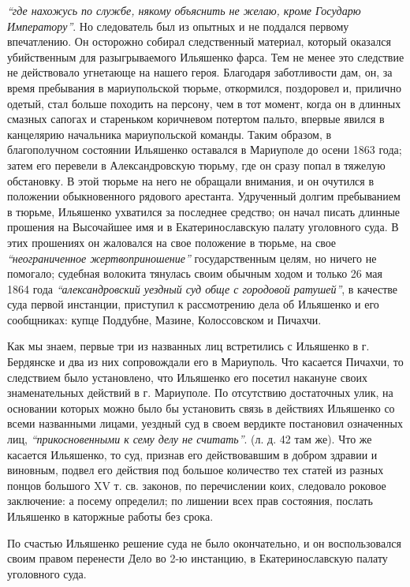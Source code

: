 \documentclass[a4paper,20pt]{article}
\begin{document}
\emph{``где нахожусь по службе, някому объяснить не желаю, кроме Государю Императору''}. 
Но следователь был из опытных и не поддался первому впечатлению. Он осторожно собирал следственный материал, который оказался
убийственным для разыгрываемого Ильяшенко фарса.
Тем не менее это следствие не действовало угнетающе на нашего героя. 
Благодаря заботливости дам, он, за время пребывания в мариупольской тюрьме, откормился, 
поздоровел и, прилично одетый, стал больше походить на персону, чем в тот
момент, когда он в длинных смазных сапогах и стареньком коричневом потертом пальто, 
впервые явился в
канцелярию начальника мариупольской команды. Таким образом, в благополучном состоянии Ильяшенко оставался в Мариуполе до осени
1863 года; затем его перевели в
Александровскую тюрьму, где он сразу попал в тяжелую
обстановку. В этой тюрьме на него не обращали внимания,
и он очутился в положении обыкновенного рядового арестанта.
Удрученный долгим пребыванием в тюрьме, Ильяшенко ухватился за последнее средство; он начал писать длинные прошения на Высочайшее имя и в Екатеринославскую палату уголовного суда. В этих прошениях он жаловался на свое положение в тюрьме, 
на свое \emph{``неограниченное жертвоприношение''} государственным целям, но ничего не помогало; судебная волокита тянулась
своим обычным ходом и только 26 мая 1864 года
\emph{``александровский уездный суд обще с городовой ратушей''},
в качестве суда первой инстанции, приступил к рассмотрению дела об Ильяшенко и его сообщниках:
купце Поддубне, Мазине, Колоссовском и Пичахчи.

Как мы знаем, первые три из названных лиц
встретились с Ильяшенко в г. Бердянске и два из них
сопровождали его в Мариуполь. Что касается Пичахчи, то
следствием было установлено, что Ильяшенко его посетил накануне своих знаменательных действий в г. Мариуполе.
По отсутствию достаточных улик, на основании которых
можно было бы установить связь в действиях Ильяшенко
со всеми названными лицами, уездный суд в своем вердикте постановил
означенных лиц, \emph{``прикосновенными к сему делу не считать''}. (л. д. 42 там же). 
Что же касается Ильяшенко, то суд, признав его действовавшим в добром здравии и
виновным, подвел его действия под большое количество тех статей из разных
понцов большого XV т. св. законов, по перечислении коих, следовало роковое
заключение: а посему определил; по лишении всех прав состояния, послать
Ильяшенко в каторжные работы без срока.

По счастью Ильяшенко решение суда не было окончательно, и он воспользовался 
своим правом перенести Дело во 2-ю инстанцию, в Екатеринославскую палату уголовного суда. 
\end{document}
